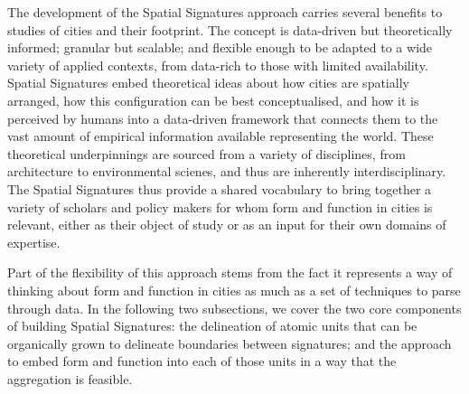 The development of the Spatial Signatures approach carries several benefits
to studies of cities and their footprint.
The concept is data-driven but theoretically informed;
granular but scalable; and flexible enough to be adapted to a wide variety of
applied contexts, from data-rich to those with limited availability.
Spatial Signatures embed theoretical ideas about how cities are
spatially arranged, how this configuration can be best conceptualised, and how
it is perceived by humans into a data-driven framework that connects them to the
vast amount of empirical information available representing the world.
These theoretical underpinnings are sourced from a variety of disciplines,
from architecture to environmental scienes, and thus are inherently
interdisciplinary.
The Spatial Signatures thus provide a shared vocabulary to bring together a
variety of scholars and policy makers for whom form and function in cities is
relevant, either as their object of study or as an input for their own domains
of expertise.

Part of the flexibility of this approach stems from the fact it represents a
way of thinking about form and function in cities as much as a set of
techniques to parse through data.
%
In the following two subsections, we cover the two core components of building
Spatial Signatures: the delineation of atomic units that can be organically
grown to delineate boundaries between signatures; and the approach to embed
form and function into each of those units in a way that the aggregation is
feasible.





